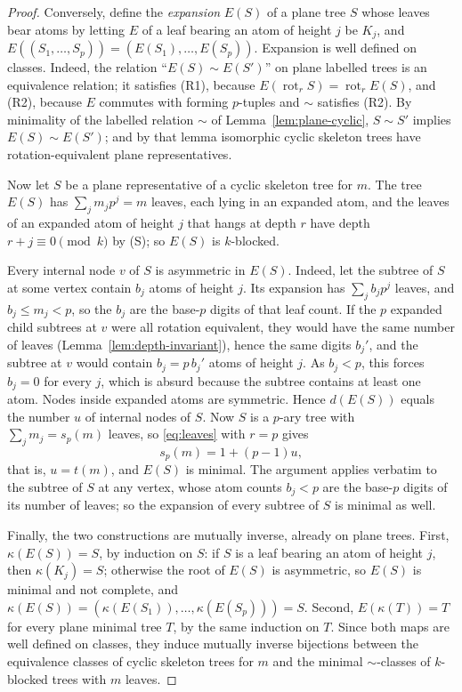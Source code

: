 \documentclass[11pt]{amsart}
\theoremstyle{definition}
\theoremstyle{remark}
\newcommand{\rot}{\operatorname{rot}}
\begin{document}
\begin{proof}
Conversely, define the \emph{expansion} $E(S)$ of a plane tree $S$ whose leaves bear atoms by letting $E$ of a leaf bearing an atom of height $j$ be $K_j$, and $E((S_1,\ldots,S_p))=(E(S_1),\ldots,E(S_p))$.  Expansion is well defined on classes.  Indeed, the relation ``$E(S)\sim E(S')$'' on plane labelled trees is an equivalence relation; it satisfies (R1), because $E(\rot_rS)=\rot_rE(S)$, and (R2), because $E$ commutes with forming $p$-tuples and $\sim$ satisfies (R2).  By minimality of the labelled relation $\sim$ of Lemma~\ref{lem:plane-cyclic}, $S\sim S'$ implies $E(S)\sim E(S')$; and by that lemma isomorphic cyclic skeleton trees have rotation-equivalent plane representatives.

Now let $S$ be a plane representative of a cyclic skeleton tree for $m$.  The tree $E(S)$ has $\sum_jm_jp^j=m$ leaves, each lying in an expanded atom, and the leaves of an expanded atom of height $j$ that hangs at depth $r$ have depth $r+j\equiv0\pmod k$ by (S); so $E(S)$ is $k$-blocked.

Every internal node $v$ of $S$ is asymmetric in $E(S)$.  Indeed, let the subtree of $S$ at some vertex contain $b_j$ atoms of height $j$.  Its expansion has $\sum_jb_jp^j$ leaves, and $b_j\le m_j<p$, so the $b_j$ are the base-$p$ digits of that leaf count.  If the $p$ expanded child subtrees at $v$ were all rotation equivalent, they would have the same number of leaves (Lemma~\ref{lem:depth-invariant}), hence the same digits $b_j'$, and the subtree at $v$ would contain $b_j=p\,b_j'$ atoms of height $j$.  As $b_j<p$, this forces $b_j=0$ for every $j$, which is absurd because the subtree contains at least one atom.  Nodes inside expanded atoms are symmetric.  Hence $d(E(S))$ equals the number $u$ of internal nodes of $S$.  Now $S$ is a $p$-ary tree with $\sum_jm_j=s_p(m)$ leaves, so \eqref{eq:leaves} with $r=p$ gives
\[
 s_p(m)=1+(p-1)u,
\]
that is, $u=t(m)$, and $E(S)$ is minimal.  The argument applies verbatim to the subtree of $S$ at any vertex, whose atom counts $b_j<p$ are the base-$p$ digits of its number of leaves; so the expansion of every subtree of $S$ is minimal as well.

Finally, the two constructions are mutually inverse, already on plane trees.  First, $\kappa(E(S))=S$, by induction on $S$: if $S$ is a leaf bearing an atom of height $j$, then $\kappa(K_j)=S$; otherwise the root of $E(S)$ is asymmetric, so $E(S)$ is minimal and not complete, and $\kappa(E(S))=(\kappa(E(S_1)),\ldots,\kappa(E(S_p)))=S$.  Second, $E(\kappa(T))=T$ for every plane minimal tree $T$, by the same induction on $T$.  Since both maps are well defined on classes, they induce mutually inverse bijections between the equivalence classes of cyclic skeleton trees for $m$ and the minimal $\sim$-classes of $k$-blocked trees with $m$ leaves.
\end{proof}
\end{document}
